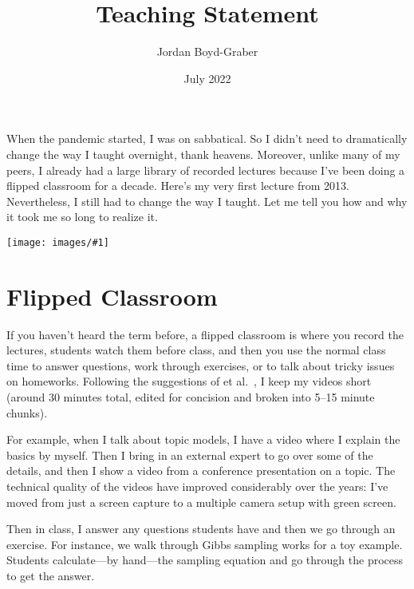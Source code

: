 \documentclass[11pt]{amsart}
\newcommand{\image}[2]{  \begin{center}
\texttt{[image: images/\#1]}
\end{center}
  }
\newcommand{\newcite}[2]{\capitalisewords{#1} et al.~\cite{#1-#2}}
\begin{document}
 \title{Teaching Statement}

 \author{Jordan Boyd-Graber}
\address{University of Maryland}

\date{July 2022}

\maketitle

When the pandemic started, I was on sabbatical.  So I didn't need to
dramatically change the way I taught overnight, thank heavens.
%
Moreover, unlike many of my peers, I
already had a large library of recorded lectures because I've been
doing a flipped classroom for a decade.  Here's my very first lecture
from 2013.
%
Nevertheless, I still had to change the way I taught.
%
Let me tell you how and why it took me so long to realize it.

\image{first_video_lecture}{}

\section{Flipped Classroom}

If you haven't heard the term before, a flipped classroom is where you
record the lectures, students watch them before class, and then you
use the normal class time to answer questions, work through exercises,
or to talk about tricky issues on homeworks.
%
Following the
suggestions of \newcite{Zappe}{09}, I keep my videos short (around 30
minutes total, edited for concision and broken into 5--15 minute
chunks).

For example, when I talk about topic models, I have a video where I
explain the basics by myself.
%
Then I bring in an external expert to
go over some of the details, and then I show a video from a conference
presentation on a topic.
%
The technical quality of the videos have
improved considerably over the years: I've moved from just a screen
capture to a multiple camera setup with green screen.

Then in class, I answer any questions students have and then we go
through an exercise.
%
For instance, we walk through Gibbs sampling
works for a toy example.
%
Students calculate—by hand—the sampling
equation and go through the process to get the answer.

%
\end{document}
